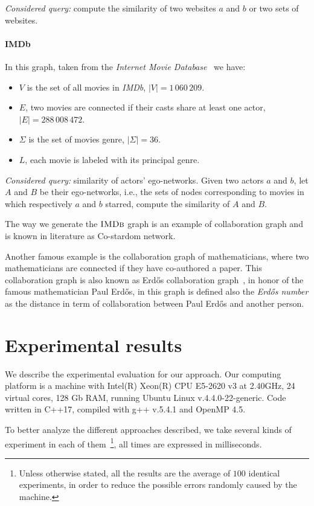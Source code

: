 \textsl{Considered query:} compute the similarity of two websites $a$ and $b$ or two sets of websites.

\paragraph*{IMDb} In this graph, taken from the \textit{Internet Movie Database}~\cite{imdb} we have:

\begin{itemize}
	\item $V$ is the set of all movies in \textit{IMDb},  $|V| = 1\,060\,209$.
	\item $E$, two movies are connected if their casts share at least one actor, $|E| = 288\,008\,472$.
	\item $\Sigma$ is the set of movies genre, $|\Sigma| = 36$.
	\item $L$, each movie is labeled with its principal genre.
\end{itemize}

\textsl{Considered query:} similarity of actors' ego-networks. Given two actors $a$ and $b$, let $A$ and $B$ be their ego-networks, i.e., the sets of nodes corresponding to movies in which respectively $a$ and $b$ starred, compute the similarity of $A$ and $B$.\medskip

The way we generate the $\textsc{IMDb}$ graph is an example of collaboration graph and is known in literature as Co-stardom network. 

Another famous example is the collaboration graph of mathematicians, where two mathematicians are connected if they have co-authored a paper. 
This collaboration graph is also known as Erdős collaboration graph~\cite{BATAGELJ2000173}, in honor of the famous mathematician Paul Erdős, in this graph is defined also the \textit{Erdős number} as the distance in term of collaboration between Paul Erdős and another person.

\section{Experimental results}

We describe the experimental evaluation for our approach. Our computing platform is a machine with Intel(R) Xeon(R) CPU E5-2620 v3 at 2.40GHz, 24 virtual cores, 128 Gb RAM, running Ubuntu Linux v.4.4.0-22-generic. Code written in C++17, compiled with g++ v.5.4.1 and OpenMP 4.5.\medskip

To better analyze the different approaches described, we take several kinds of experiment in each of them~\footnote{Unless otherwise stated, all the results are the average of $100$ identical experiments, in order to reduce the possible errors randomly caused by the machine.}, all times are expressed in milliseconds.\medskip

